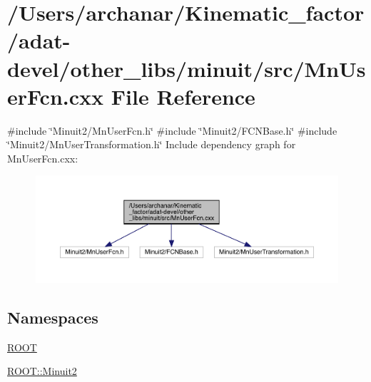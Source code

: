 \hypertarget{adat-devel_2other__libs_2minuit_2src_2MnUserFcn_8cxx}{}\section{/\+Users/archanar/\+Kinematic\+\_\+factor/adat-\/devel/other\+\_\+libs/minuit/src/\+Mn\+User\+Fcn.cxx File Reference}
\label{adat-devel_2other__libs_2minuit_2src_2MnUserFcn_8cxx}
{\ttfamily \#include \char`\"{}Minuit2/\+Mn\+User\+Fcn.\+h\char`\"{}}\newline
{\ttfamily \#include \char`\"{}Minuit2/\+F\+C\+N\+Base.\+h\char`\"{}}\newline
{\ttfamily \#include \char`\"{}Minuit2/\+Mn\+User\+Transformation.\+h\char`\"{}}\newline
Include dependency graph for Mn\+User\+Fcn.\+cxx\+:
\nopagebreak
\begin{figure}[H]
\begin{center}
\leavevmode
\includegraphics[width=350pt]{d3/d08/adat-devel_2other__libs_2minuit_2src_2MnUserFcn_8cxx__incl}
\end{center}
\end{figure}
\subsection*{Namespaces}
\begin{DoxyCompactItemize}
\item 
 \mbox{\hyperlink{namespaceROOT}{R\+O\+OT}}
\item 
 \mbox{\hyperlink{namespaceROOT_1_1Minuit2}{R\+O\+O\+T\+::\+Minuit2}}
\end{DoxyCompactItemize}
